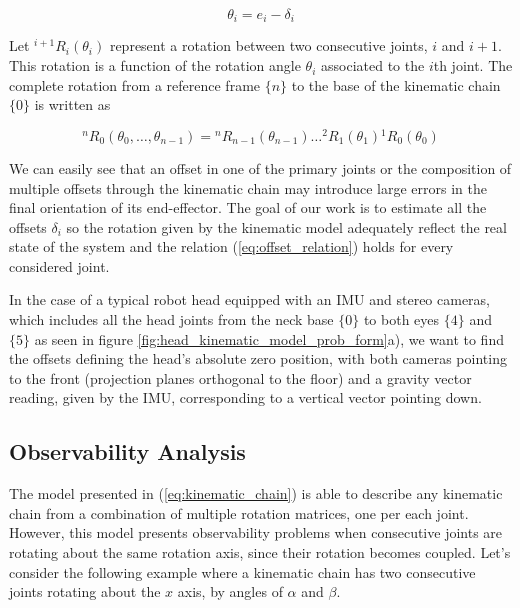 \begin{equation}
\theta_{i} = e_{i}-\delta_{i}
\label{eq:offset_relation}
\end{equation}

Let $^{i+1}R_{i}\left(\theta_{i}\right)$ represent a rotation between two consecutive joints, $i$ and $i+1$. This rotation is a function of the rotation angle $\theta_{i}$ associated to the $i$th joint. The complete rotation from a reference frame $\{n\}$ to the base of the kinematic chain $\{0\}$ is written as

\begin{equation}
^{n}R_{0}\left(\theta_{0},\ldots,\theta_{n-1}\right)={}^{n}R_{n-1}\left(\theta_{n-1}\right)\ldots{}^{2}R_{1}\left(\theta_{1}\right){}^{1}R_{0}\left(\theta_{0}\right)
\label{eq:kinematic_chain}
\end{equation}

We can easily see that an offset in one of the primary joints or the composition of multiple offsets through the kinematic chain may introduce large errors in the final orientation of its end-effector. The goal of our work is to estimate all the offsets $\delta_{i}$ so the rotation given by the kinematic model adequately reflect the real state of the system and the relation (\ref{eq:offset_relation}) holds for every considered joint.

In the case of a typical robot head equipped with an IMU and stereo cameras, which includes all the head joints from the neck base $\{0\}$ to both eyes $\{4\}$ and $\{5\}$ as seen in figure \ref{fig:head_kinematic_model_prob_form}a), we want to find the offsets defining the head's absolute zero position, with both cameras pointing to the front (projection planes orthogonal to the floor) and a gravity vector reading, given by the IMU, corresponding to a vertical vector pointing down.

\subsection{Observability Analysis}

The model presented in (\ref{eq:kinematic_chain}) is able to describe any kinematic chain from a combination of multiple rotation matrices, one per each joint. However, this model presents observability problems when consecutive joints are rotating about the same rotation axis, since their rotation becomes coupled. Let's consider the following example where a kinematic chain has two consecutive joints rotating about the $x$ axis, by angles of $\alpha$ and $\beta$. 

